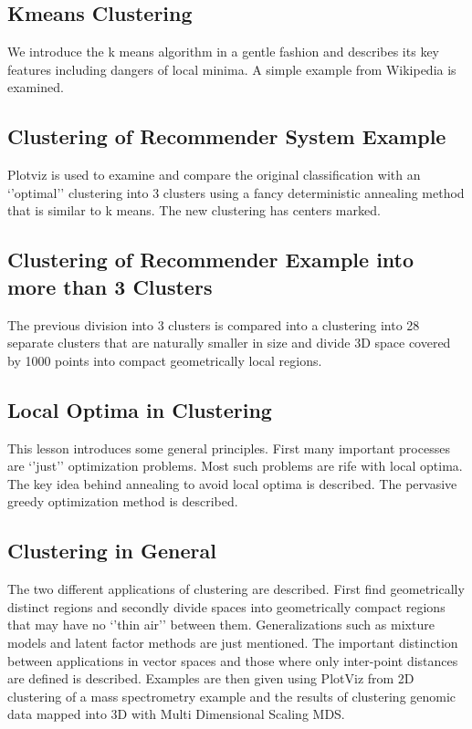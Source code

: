 \subsection{Kmeans Clustering}\label{kmeans-clustering}

We introduce the k means algorithm in a gentle fashion and describes its
key features including dangers of local minima. A simple example from
Wikipedia is examined.

\subsection{Clustering of Recommender System
Example}\label{clustering-of-recommender-system-example}

Plotviz is used to examine and compare the original classification with
an `'optimal'' clustering into 3 clusters using a fancy deterministic
annealing method that is similar to k means. The new clustering has
centers marked.

\subsection{Clustering of Recommender Example into more than 3
Clusters}\label{clustering-of-recommender-example-into-more-than-3-clusters}

The previous division into 3 clusters is compared into a clustering into
28 separate clusters that are naturally smaller in size and divide 3D
space covered by 1000 points into compact geometrically local regions.

\subsection{Local Optima in
Clustering}\label{local-optima-in-clustering}

This lesson introduces some general principles. First many important
processes are `'just'' optimization problems. Most such problems are
rife with local optima. The key idea behind annealing to avoid local
optima is described. The pervasive greedy optimization method is
described.

\subsection{Clustering in General}\label{clustering-in-general}

The two different applications of clustering are described. First find
geometrically distinct regions and secondly divide spaces into
geometrically compact regions that may have no `'thin air'' between
them. Generalizations such as mixture models and latent factor methods
are just mentioned. The important distinction between applications in
vector spaces and those where only inter-point distances are defined is
described. Examples are then given using PlotViz from 2D clustering of a
mass spectrometry example and the results of clustering genomic data
mapped into 3D with Multi Dimensional Scaling MDS.

